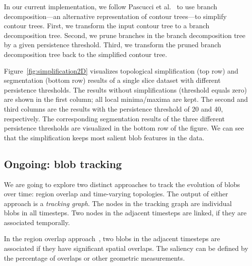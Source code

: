 In our current implementation, we follow Pascucci et al.~\cite{Pascucci2004} to use branch decomposition---an alternative representation of contour trees---to simplify contour trees.  First, we transform the input contour tree to a branch decomposition tree.  Second, we prune branches in the branch decomposition tree by a given persistence threshold.  Third, we transform the pruned branch decomposition tree back to the simplified contour tree.  

Figure~\ref{fig:simplification2D} visualizes topological simplification (top row) and segmentation (bottom row) results of a single slice dataset with different persistence thresholds.  The results without simplifications (threshold equals zero) are shown in the first column; all local minima/maxima are kept.  The second and third columns are the results with the persistence threshold of 20 and 40, respectively.  The corresponding segmentation results of the three different persistence thresholds are visualized in the bottom row of the figure.  We can see that the simplification keeps most salient blob features in the data.  




\subsection{Ongoing: blob tracking}

We are going to explore two distinct approaches to track the evolution of blobs over time: region overlap and time-varying topologies.  The output of either approach is a \emph{tracking graph}.  The nodes in the tracking graph are individual blobs in all timesteps.  Two nodes in the adjacent timesteps are linked, if they are associated temporally.  

In the region overlap approach~\cite{SilverW98}, two blobs in the adjacent timesteps are associated if they have significant spatial overlaps.  The saliency can be defined by the percentage of overlaps or other geometric measurements.  

